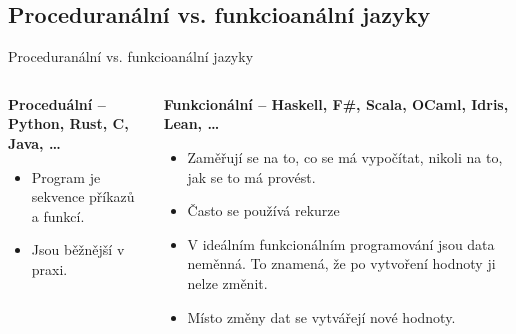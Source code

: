 \documentclass[aspectratio=169,xcolor=dvipsnames, t]{beamer}
\begin{document}
{\subsection{Proceduranální vs. funkcioanální jazyky}
\begin{frame}{Proceduranální vs. funkcioanální jazyky}
    \begin{columns}
        \begin{column}{0.5\textwidth}
            \textbf{Proceduální -- Python, Rust, C, Java, \ldots}
            \begin{itemize}
                \item Program je sekvence příkazů a funkcí.
                \item Jsou běžnější v praxi.
            \end{itemize}
        \end{column}
        \begin{column}{0.5\textwidth}
            \textbf{Funkcionální -- Haskell, F\#, Scala, OCaml, Idris, Lean, \ldots}
            \begin{itemize}
                \item Zaměřují se na to, co se má vypočítat, nikoli na to, jak se to má provést.
                \item Často se používá rekurze
                \item V ideálním funkcionálním programování jsou data neměnná. To znamená, že po vytvoření hodnoty ji nelze změnit.
                \item Místo změny dat se vytvářejí nové hodnoty.
            \end{itemize}
        \end{column}
    \end{columns}
\end{frame}





}
\end{document}
